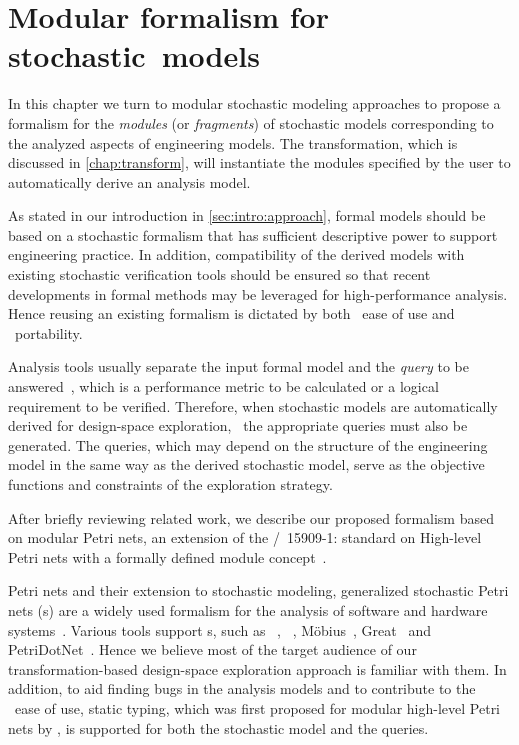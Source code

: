 \chapter{Modular formalism for stochastic~models}
\label{chap:rgspn}

In this chapter we turn to modular stochastic modeling approaches to propose a formalism for the \emph{modules} (or \emph{fragments}) of stochastic models corresponding to the analyzed aspects of engineering models. The transformation, which is discussed in \cref{chap:transform}, will instantiate the modules specified by the user to automatically derive an analysis model.

As stated in our introduction in \vref{sec:intro:approach}, formal models should be based on a stochastic formalism that has sufficient descriptive power to support engineering practice. In addition, compatibility of the derived models with existing stochastic verification tools should be ensured so that recent developments in formal methods may be leveraged for high-performance analysis. Hence reusing an existing formalism is dictated by both ~ease of use and ~portability.

Analysis tools usually separate the input formal model and the \emph{query} to be answered~, which is a performance metric to be calculated or a logical requirement to be verified. Therefore, when stochastic models are automatically derived for design-space exploration, ~the appropriate queries must also be generated. The queries, which may depend on the structure of the engineering model in the same way as the derived stochastic model, serve as the objective functions and constraints of the exploration strategy.

After briefly reviewing related work, we describe our proposed formalism based on modular Petri nets, an extension of the /~15909-1:\citeyear{ISO1590912004} standard on High-level Petri nets with a formally defined module concept~\citep{Kindler09modular}.

Petri nets and their extension to stochastic modeling, generalized stochastic Petri nets (s) are a widely used formalism for the analysis of software and hardware systems~\citep{Murata89petri}. Various tools support s, such as ~\citep{Hirel00spnp}, ~\citep{Ciardo06smart}, M\"obius~\citep{Courtney09mobius}, Great~\citep{Babar10greatspn} and Petri\-Dot\-Net~\citep{Voros17pdn}. Hence we believe most of the target audience of our transformation-based design-space exploration approach is familiar with them. In addition, to aid finding bugs in the analysis models and to contribute to the ~ease of use, static typing, which was first proposed for modular high-level Petri nets by \citet{Kindler07modular}, is supported for both the stochastic model and the queries.

